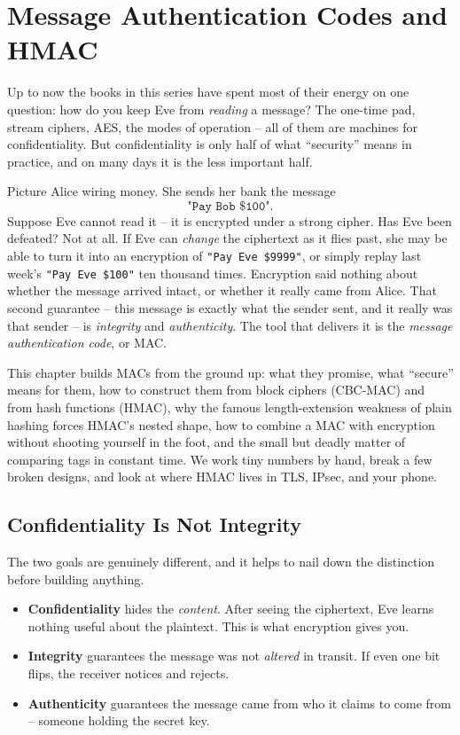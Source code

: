\chapter{Message Authentication Codes and HMAC}

Up to now the books in this series have spent most of their energy on one question: how do you keep Eve from \emph{reading} a message? The one-time pad, stream ciphers, AES, the modes of operation -- all of them are machines for confidentiality. But confidentiality is only half of what ``security'' means in practice, and on many days it is the less important half.

Picture Alice wiring money. She sends her bank the message
\[
\texttt{"Pay Bob \$100"}.
\]
Suppose Eve cannot read it -- it is encrypted under a strong cipher. Has Eve been defeated? Not at all. If Eve can \emph{change} the ciphertext as it flies past, she may be able to turn it into an encryption of \texttt{"Pay Eve \$9999"}, or simply replay last week's \texttt{"Pay Eve \$100"} ten thousand times. Encryption said nothing about whether the message arrived intact, or whether it really came from Alice. That second guarantee -- this message is exactly what the sender sent, and it really was that sender -- is \emph{integrity} and \emph{authenticity}. The tool that delivers it is the \emph{message authentication code}, or MAC.

This chapter builds MACs from the ground up: what they promise, what ``secure'' means for them, how to construct them from block ciphers (CBC-MAC) and from hash functions (HMAC), why the famous length-extension weakness of plain hashing forces HMAC's nested shape, how to combine a MAC with encryption without shooting yourself in the foot, and the small but deadly matter of comparing tags in constant time. We work tiny numbers by hand, break a few broken designs, and look at where HMAC lives in TLS, IPsec, and your phone.

\chapterline

\section{Confidentiality Is Not Integrity}
\label{ch15:conf-vs-integrity}

The two goals are genuinely different, and it helps to nail down the distinction before building anything.

\begin{itemize}
  \item \textbf{Confidentiality} hides the \emph{content}. After seeing the ciphertext, Eve learns nothing useful about the plaintext. This is what encryption gives you.
  \item \textbf{Integrity} guarantees the message was not \emph{altered} in transit. If even one bit flips, the receiver notices and rejects.
  \item \textbf{Authenticity} guarantees the message came from who it claims to come from -- someone holding the secret key.
\end{itemize}

